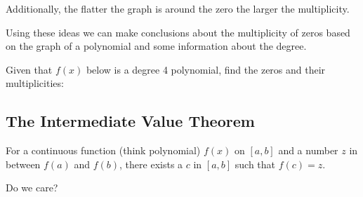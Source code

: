 Additionally, the flatter the graph is around the zero the larger the multiplicity.

\vspace{0.5em}

Using these ideas we can make conclusions about the multiplicity of zeros based
on the graph of a polynomial and some information about the degree.

\ifprintanswers\else\newpage\fi

\begin{exercise}
Given that $f(x)$ below is a degree 4 polynomial, find
the zeros and their multiplicities:
\begin{center}
\end{center}
\end{exercise}
\begin{solution}[3in]

\end{solution}

\subsection{The Intermediate Value Theorem}

\begin{center}
\end{center}

\begin{theorem}\label{thm: IVT}
For a continuous function (think polynomial) $f(x)$ on $[a,b]$
and a number $z$ in between $f(a)$ and $f(b)$, there exists a $c$
in $[a,b]$ such that $f(c)=z$.
\end{theorem}

\begin{ques}
Do we care?
\end{ques}

